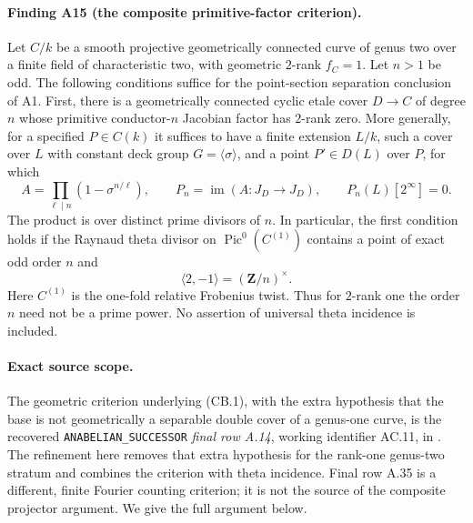 \documentclass[11pt,a4paper]{article}
\begin{document}
\paragraph{Finding A15 (the composite primitive-factor criterion).}
Let $C/k$ be a smooth projective geometrically connected curve of genus
two over a finite field of characteristic two, with geometric $2$-rank
$f_C=1$. Let $n>1$ be odd. The following conditions suffice for the
point-section separation conclusion of A1.
First, there is a geometrically connected cyclic etale cover
$D\to C$ of degree $n$ whose primitive conductor-$n$ Jacobian factor
has $2$-rank zero. More generally, for a specified $P\in C(k)$ it
suffices to have a finite extension $L/k$, such a cover over $L$ with
constant deck group $G=\langle\sigma\rangle$, and a point
$P'\in D(L)$ over $P$, for which
\[
 A=\prod_{\ell\mid n}(1-\sigma^{n/\ell}),\qquad
 P_n=\operatorname{im}(A:J_D\longrightarrow J_D),\qquad
 P_n(L)[2^\infty]=0.                                      \tag{CB.1}
\]
The product is over distinct prime divisors of $n$.
In particular, the first condition holds if the Raynaud theta divisor
on $\operatorname{Pic}^0(C^{(1)})$ contains a point of exact odd order
$n$ and
\[
                    \langle 2,-1\rangle=(\mathbf Z/n)^\times.
                                                               \tag{CB.2}
\]
Here $C^{(1)}$ is the one-fold relative Frobenius twist. Thus for
$2$-rank one the order $n$ need not be a prime power. No assertion of
universal theta incidence is included.

\paragraph{Exact source scope.}
The geometric criterion underlying (CB.1), with the extra hypothesis
that the base is not geometrically a separable double cover of a
genus-one curve, is the recovered \texttt{ANABELIAN\_SUCCESSOR}
\emph{final row A.14}, working identifier AC.11, in
. The refinement here
removes that extra hypothesis for the rank-one genus-two stratum and
combines the criterion with theta incidence. Final row A.35 is a
different, finite Fourier counting criterion; it is not the source of
the composite projector argument. We give the full argument below.
\end{document}
